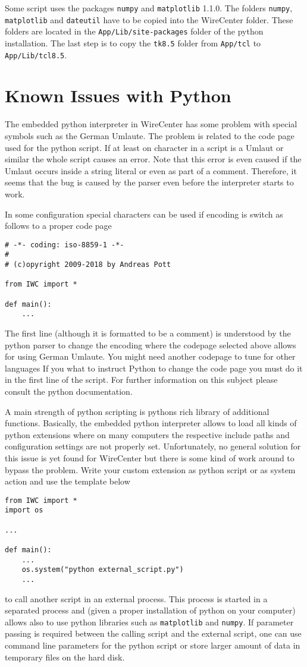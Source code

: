 \documentclass[11pt,a4paper,onepage,openany]{book}
\begin{document}
Some script uses the packages \texttt{numpy} and \texttt{matplotlib} 1.1.0. The
folders \texttt{numpy}, \texttt{matplotlib} and \texttt{dateutil} have to be
copied into the WireCenter folder. These folders are located in the
\texttt{App/Lib/site-packages} folder of the python installation. The last step
is to copy the \texttt{tk8.5} folder from \texttt{App/tcl} to
\texttt{App/Lib/tcl8.5}.

\section{Known Issues with Python}%
The embedded python interpreter in WireCenter has some problem with special
symbols such as the German Umlaute. The problem is related to the code page
used for the python script. If at least on character in a script is a Umlaut or
similar the whole script causes an error. Note that this error is even caused
if the Umlaut occurs inside a string literal or even as part of a comment.
Therefore, it seems that the bug is caused by the parser even before the
interpreter starts to work.

In some configuration special characters can be used if encoding is switch as
follows to a proper code page
\begin{verbatim}
# -*- coding: iso-8859-1 -*-
#
# (c)opyright 2009-2018 by Andreas Pott

from IWC import *

def main():
	...
\end{verbatim}
The first line (although it is formatted to be a comment) is understood by the
python parser to change the encoding where the codepage selected above allows
for using German Umlaute. You might need another codepage to tune for other 
languages If you what to instruct Python to change the code
page you must do it in the first line of the script. For further information on
this subject please consult the python documentation.

A main strength of python scripting is pythons rich library of additional
functions. Basically, the embedded python interpreter allows to load all kinds
of python extensions where on many computers the respective include paths and
configuration settings are not properly set. Unfortunately, no general solution
for this issue is yet found for WireCenter but there is some kind of work around
to bypass the problem. Write your custom extension as python script or as system
action and use the template below
\begin{verbatim}
from IWC import *
import os

...

def main():
    ...
    os.system("python external_script.py")
    ...
\end{verbatim}
to call another script in an external process. This process is started in a 
separated process and (given a proper installation of python on your computer) 
allows also to use python libraries such as \texttt{matplotlib} and \texttt{numpy}.
If parameter passing is required between the calling script and the external 
script, one can use command line parameters for the python script or store larger 
amount of data in temporary files on the hard disk.
\end{document}
